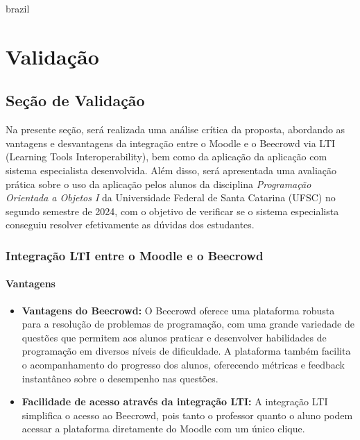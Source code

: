 

\begin{otherlanguage*}{brazil}

\chapter{Validação}

\section{Seção de Validação}

Na presente seção, será realizada uma análise crítica da proposta, abordando as vantagens e desvantagens da integração entre o Moodle e o Beecrowd via LTI (Learning Tools Interoperability), bem como da aplicação da aplicação com sistema especialista desenvolvida. Além disso, será apresentada uma avaliação prática sobre o uso da aplicação pelos alunos da disciplina \textit{Programação Orientada a Objetos I} da Universidade Federal de Santa Catarina (UFSC) no segundo semestre de 2024, com o objetivo de verificar se o sistema especialista conseguiu resolver efetivamente as dúvidas dos estudantes.

\subsection{Integração LTI entre o Moodle e o Beecrowd}

\subsubsection{Vantagens}
\begin{itemize}
    \item \textbf{Vantagens do Beecrowd:} O Beecrowd oferece uma plataforma robusta para a resolução de problemas de programação, com uma grande variedade de questões que permitem aos alunos praticar e desenvolver habilidades de programação em diversos níveis de dificuldade. A plataforma também facilita o acompanhamento do progresso dos alunos, oferecendo métricas e feedback instantâneo sobre o desempenho nas questões.
    \item \textbf{Facilidade de acesso através da integração LTI:} A integração LTI simplifica o acesso ao Beecrowd, pois tanto o professor quanto o aluno podem acessar a plataforma diretamente do Moodle com um único clique.
\end{itemize}


\end{otherlanguage*}
